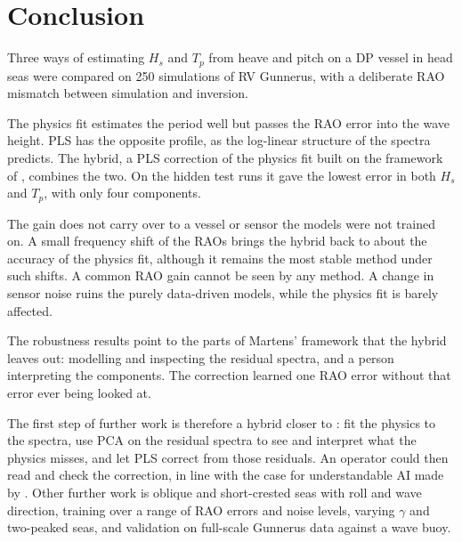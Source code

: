 \documentclass[10pt,a4paper,twocolumn,twoside]{article}
\newcommand{\Hs}{H_{s}}
\newcommand{\Tp}{T_{p}}
\begin{document}
\section{Conclusion}
\label{sec:conclusion}

Three ways of estimating $\Hs$ and $\Tp$ from heave and pitch on a DP vessel in head seas were
compared on 250 simulations of RV Gunnerus, with a deliberate RAO mismatch between simulation and
inversion.

The physics fit estimates the period well but passes the RAO error into the wave height. PLS has
the opposite profile, as the log-linear structure of the spectra predicts. The hybrid, a PLS
correction of the physics fit built on the framework of \citet{martens2023}, combines the two. On
the hidden test runs it gave the lowest error in both $\Hs$ and $\Tp$, with only four components.

The gain does not carry over to a vessel or sensor the models were not trained on. A small
frequency shift of the RAOs brings the hybrid back to about the accuracy of the physics fit,
although it remains the most stable method under such shifts. A common RAO gain cannot be seen by
any method. A change in sensor noise ruins the purely data-driven models, while the physics fit is
barely affected.

The robustness results point to the parts of Martens' framework that the hybrid leaves out:
modelling and inspecting the residual spectra, and a person interpreting the components. The
correction learned one RAO error without that error ever being looked at.

The first step of further work is therefore a hybrid closer to \citet{martens2023}: fit the physics
to the spectra, use PCA on the residual spectra to see and interpret what the physics misses, and
let PLS correct from those residuals. An operator could then read and check the correction, in line
with the case for understandable AI made by \citet{martens2025}. Other further work is oblique and
short-crested seas with roll and wave direction, training over a range of RAO errors and noise
levels, varying $\gamma$ and two-peaked seas, and validation on full-scale Gunnerus data against a
wave buoy.



\end{document}
